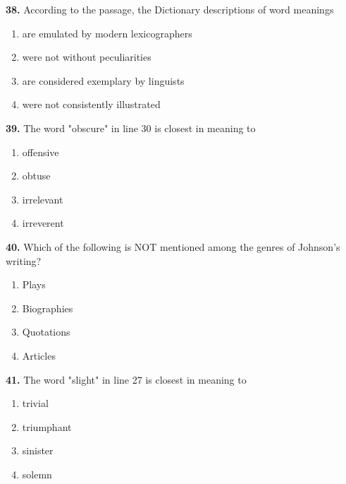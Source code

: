 \documentclass[12pt]{article}
\begin{document}
\par
\vspace{0.25\baselineskip}
\noindent\textbf{38.} According to the passage, the Dictionary descriptions of word meanings
\begin{enumerate}[label=(\Alph*),leftmargin=*,itemsep=0.2em]
\item are emulated by modern lexicographers
\item were not without peculiarities
\item are considered exemplary by linguists
\item were not consistently illustrated
\end{enumerate}
\par
\vspace{0.25\baselineskip}
\noindent\textbf{39.} The word "obscure" in line 30 is closest in meaning to
\begin{enumerate}[label=(\Alph*),leftmargin=*,itemsep=0.2em]
\item offensive
\item obtuse
\item irrelevant
\item irreverent
\end{enumerate}
\par
\vspace{0.25\baselineskip}
\noindent\textbf{40.} Which of the following is NOT mentioned among the genres of Johnson's writing?
\begin{enumerate}[label=(\Alph*),leftmargin=*,itemsep=0.2em]
\item Plays
\item Biographies
\item Quotations
\item Articles
\end{enumerate}
\par
\vspace{0.25\baselineskip}
\noindent\textbf{41.} The word "slight" in line 27 is closest in meaning to
\begin{enumerate}[label=(\Alph*),leftmargin=*,itemsep=0.2em]
\item trivial
\item triumphant
\item sinister
\item solemn
\end{enumerate}
\par
\vspace{0.25\baselineskip}
\end{document}
